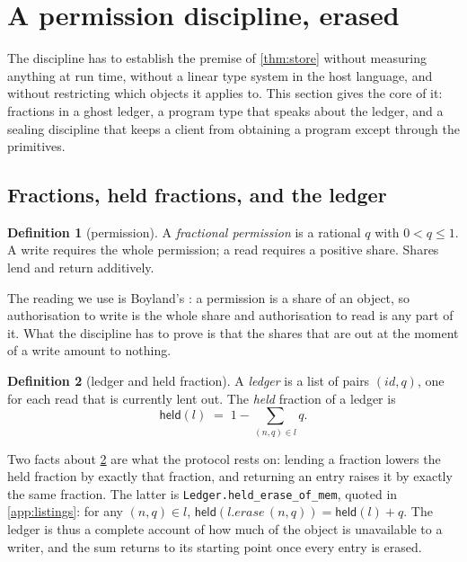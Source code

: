 \documentclass[11pt,a4paper]{article}
\theoremstyle{definition}
\newtheorem{definition}{Definition}[section]
\theoremstyle{plain}
\newcommand{\held}{\mathsf{held}}
\newcommand{\code}[1]{\texttt{#1}}
\begin{document}
\section{A permission discipline, erased}\label{sec:perm}

The discipline has to establish the premise of \cref{thm:store} without
measuring anything at run time, without a linear type system in the host
language, and without restricting which objects it applies to. This section
gives the core of it: fractions in a ghost ledger, a program type that speaks
about the ledger, and a sealing discipline that keeps a client from obtaining a
program except through the primitives.

\subsection{Fractions, held fractions, and the ledger}

\begin{definition}[permission]\label{def:frac}
A \emph{fractional permission} is a rational $q$ with $0 < q \leq 1$. A write
requires the whole permission; a read requires a positive share. Shares lend and
return additively.
\end{definition}

The reading we use is Boyland's \cite{boyland2003checking}: a permission is a
share of an object, so authorisation to write is the whole share and
authorisation to read is any part of it. What the discipline has to prove is
that the shares that are out at the moment of a write amount to nothing.

\begin{definition}[ledger and held fraction]\label{def:ledger}
A \emph{ledger} is a list of pairs $(\mathit{id}, q)$, one for each read that is
currently lent out. The \emph{held} fraction of a ledger is
\[
\held(l) \;=\; 1 - \sum_{(n,q) \in l} q .
\]
\end{definition}

Two facts about \cref{def:ledger} are what the protocol rests on: lending a
fraction lowers the held fraction by exactly that fraction, and returning an
entry raises it by exactly the same fraction. The latter is
\code{Ledger.held\_erase\_of\_mem}, quoted in \cref{app:listings}: for any
$(n,q) \in l$, $\held(l.\mathit{erase}\,(n,q)) = \held(l) + q$. The ledger is
thus a complete account of how much of the object is unavailable to a writer,
and the sum returns to its starting point once every entry is erased.
\end{document}
